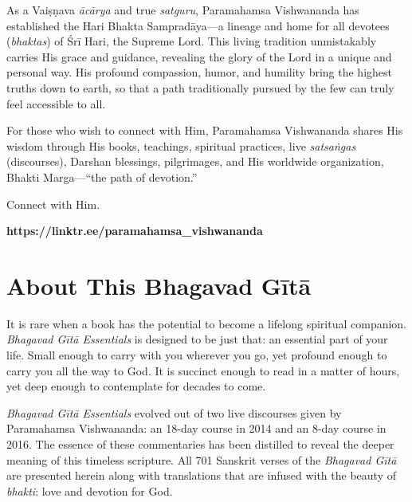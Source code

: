 \documentclass[12pt, twoside, openright]{memoir}
\begin{document}
As a Vaiṣṇava \textit{ācārya} and true \textit{satguru}, Paramahamsa Vishwananda has established the Hari Bhakta Sampradāya---a lineage and home for all devotees (\textit{bhaktas}) of Śrī Hari, the Supreme Lord. This living tradition unmistakably carries His grace and guidance, revealing the glory of the Lord in a unique and personal way. His profound compassion, humor, and humility bring the highest truths down to earth, so that a path traditionally pursued by the few can truly feel accessible to all.

For those who wish to connect with Him, Paramahamsa Vishwananda shares His wisdom through His books, teachings, spiritual practices, live \textit{satsaṅgas} (discourses), Darshan blessings, pilgrimages, and His worldwide organization, Bhakti Marga---\enquote{the path of devotion.}

\bigskip

\noindent Connect with Him.

\noindent\textbf{https://linktr.ee/paramahamsa\_vishwananda}

\bigskip
\begin{center}
\end{center}
 \chapter{About This Bhagavad Gītā}\label{chap-about-this-bhagavad-gita}

It is rare when a book has the potential to become a lifelong spiritual companion. \textit{Bhagavad Gītā Essentials} is designed to be just that: an essential part of your life. Small enough to carry with you wherever you go, yet profound enough to carry you all the way to God. It is succinct enough to read in a matter of hours, yet deep enough to contemplate for decades to come. 

\textit{Bhagavad Gītā Essentials} evolved out of two live discourses given by Paramahamsa Vishwananda: an 18-day course in 2014 and an 8-day course in 2016. The essence of these commentaries has been distilled to reveal the deeper meaning of this timeless scripture. All 701 Sanskrit verses of the \textit{Bhagavad Gītā} are presented herein along with translations that are infused with the beauty of \textit{bhakti}: love and devotion for God. 
\end{document}
